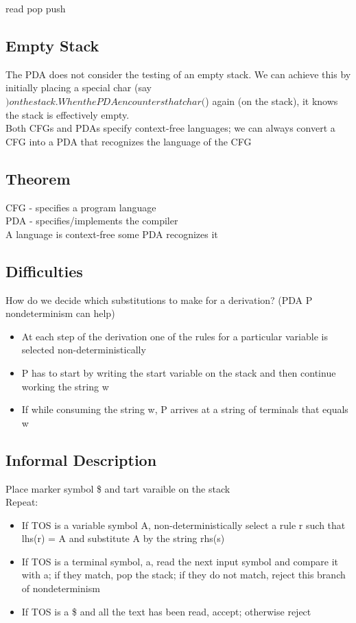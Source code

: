 \documentclass[11pt]{article}
\begin{document}
read pop push\\
\subsection{Empty Stack}
\label{sec:org3f3e88d}
The PDA does not consider the testing of an empty stack. We can achieve this by initially placing a special char (say \() on the stack. When the PDA encounters that char (\)) again (on the stack), it knows the stack is effectively empty.\\

Both CFGs and PDAs specify context-free languages; we can always convert a CFG into a PDA that recognizes the language of the CFG\\
\subsection{Theorem}
\label{sec:orge819a68}
CFG - specifies a program language\\
PDA - specifies/implements the compiler\\

A language is context-free \iff{} some PDA recognizes it\\
\subsection{Difficulties}
\label{sec:org8a5cbdb}
How do we decide which substitutions to make for a derivation? (PDA P nondeterminism can help)\\
\begin{itemize}
\item At each step of the derivation one of the rules for a particular variable is selected non-deterministically\\
\item P has to start by writing the start variable on the stack and then continue working the string w\\
\item If while consuming the string w, P arrives at a string of terminals that equals w\\
\end{itemize}
\subsection{Informal Description}
\label{sec:orgdfe8183}
Place marker symbol \$ and tart varaible on the stack\\
Repeat:\\
\begin{itemize}
\item If TOS is a variable symbol A, non-deterministically select a rule r such that lhs(r) = A and substitute A by the string rhs(s)\\
\item If TOS is a terminal symbol, a, read the next input symbol and compare it with a; if they match, pop the stack; if they do not match, reject this branch of nondeterminism\\
\item If TOS is a \$ and all the text has been read, accept; otherwise reject\\
\end{itemize}
\end{document}

